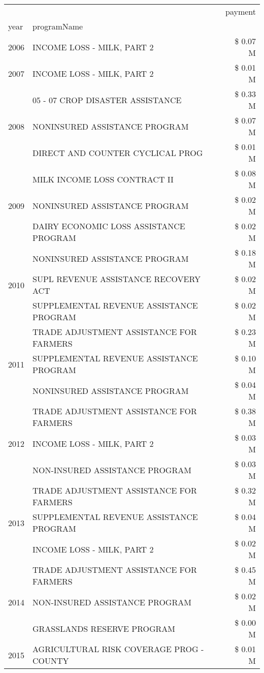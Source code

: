 \begin{tabular}{llr}
\toprule
 &  & payment \\
year & programName &  \\
\midrule
2006 & INCOME LOSS - MILK, PART 2 & \$ 0.07 M \\
\cline{1-3}
2007 & INCOME LOSS - MILK, PART 2 & \$ 0.01 M \\
\cline{1-3}
\multirow[t]{3}{*}{2008} & 05 - 07 CROP DISASTER ASSISTANCE & \$ 0.33 M \\
 & NONINSURED ASSISTANCE PROGRAM & \$ 0.07 M \\
 & DIRECT AND COUNTER CYCLICAL PROG & \$ 0.01 M \\
\cline{1-3}
\multirow[t]{3}{*}{2009} & MILK INCOME LOSS CONTRACT II & \$ 0.08 M \\
 & NONINSURED ASSISTANCE PROGRAM & \$ 0.02 M \\
 & DAIRY ECONOMIC LOSS ASSISTANCE PROGRAM & \$ 0.02 M \\
\cline{1-3}
\multirow[t]{3}{*}{2010} & NONINSURED ASSISTANCE PROGRAM & \$ 0.18 M \\
 & SUPL REVENUE ASSISTANCE RECOVERY ACT & \$ 0.02 M \\
 & SUPPLEMENTAL REVENUE ASSISTANCE PROGRAM & \$ 0.02 M \\
\cline{1-3}
\multirow[t]{3}{*}{2011} & TRADE ADJUSTMENT ASSISTANCE FOR FARMERS & \$ 0.23 M \\
 & SUPPLEMENTAL REVENUE ASSISTANCE PROGRAM & \$ 0.10 M \\
 & NONINSURED ASSISTANCE PROGRAM & \$ 0.04 M \\
\cline{1-3}
\multirow[t]{3}{*}{2012} & TRADE ADJUSTMENT ASSISTANCE FOR FARMERS & \$ 0.38 M \\
 & INCOME LOSS - MILK, PART 2 & \$ 0.03 M \\
 & NON-INSURED ASSISTANCE PROGRAM & \$ 0.03 M \\
\cline{1-3}
\multirow[t]{3}{*}{2013} & TRADE ADJUSTMENT ASSISTANCE FOR FARMERS & \$ 0.32 M \\
 & SUPPLEMENTAL REVENUE ASSISTANCE PROGRAM & \$ 0.04 M \\
 & INCOME LOSS - MILK, PART 2 & \$ 0.02 M \\
\cline{1-3}
\multirow[t]{3}{*}{2014} & TRADE ADJUSTMENT ASSISTANCE FOR FARMERS & \$ 0.45 M \\
 & NON-INSURED ASSISTANCE PROGRAM & \$ 0.02 M \\
 & GRASSLANDS RESERVE PROGRAM & \$ 0.00 M \\
\cline{1-3}
\multirow[t]{2}{*}{2015} & AGRICULTURAL RISK COVERAGE PROG - COUNTY & \$ 0.01 M \\

\end{tabular}

